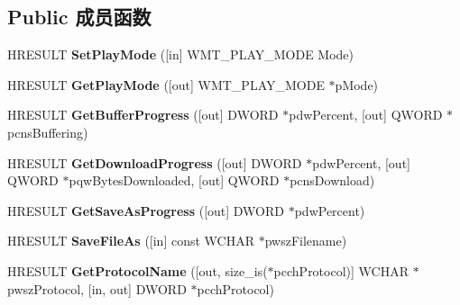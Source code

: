 \subsection*{Public 成员函数}
\begin{DoxyCompactItemize}
\item 
\mbox{\label{interface_i_w_m_reader_advanced2_a813b6b5068ddf5d5da92f3948059e417}} 
H\+R\+E\+S\+U\+LT {\bfseries Set\+Play\+Mode} (\mbox{[}in\mbox{]} W\+M\+T\+\_\+\+P\+L\+A\+Y\+\_\+\+M\+O\+DE Mode)
\item 
\mbox{\label{interface_i_w_m_reader_advanced2_abf1b3b4c48dd11c4fdda7e8d1f95f107}} 
H\+R\+E\+S\+U\+LT {\bfseries Get\+Play\+Mode} (\mbox{[}out\mbox{]} W\+M\+T\+\_\+\+P\+L\+A\+Y\+\_\+\+M\+O\+DE $\ast$p\+Mode)
\item 
\mbox{\label{interface_i_w_m_reader_advanced2_af080814eeff56e33e0cd3c07575a887b}} 
H\+R\+E\+S\+U\+LT {\bfseries Get\+Buffer\+Progress} (\mbox{[}out\mbox{]} D\+W\+O\+RD $\ast$pdw\+Percent, \mbox{[}out\mbox{]} Q\+W\+O\+RD $\ast$pcns\+Buffering)
\item 
\mbox{\label{interface_i_w_m_reader_advanced2_ab57440dd29f891ff7320f12efdf1b066}} 
H\+R\+E\+S\+U\+LT {\bfseries Get\+Download\+Progress} (\mbox{[}out\mbox{]} D\+W\+O\+RD $\ast$pdw\+Percent, \mbox{[}out\mbox{]} Q\+W\+O\+RD $\ast$pqw\+Bytes\+Downloaded, \mbox{[}out\mbox{]} Q\+W\+O\+RD $\ast$pcns\+Download)
\item 
\mbox{\label{interface_i_w_m_reader_advanced2_a3c2fcf9781498aa648ec874a13702f8d}} 
H\+R\+E\+S\+U\+LT {\bfseries Get\+Save\+As\+Progress} (\mbox{[}out\mbox{]} D\+W\+O\+RD $\ast$pdw\+Percent)
\item 
\mbox{\label{interface_i_w_m_reader_advanced2_a2cdacaf9b7a902bb61eeae4c25bf534d}} 
H\+R\+E\+S\+U\+LT {\bfseries Save\+File\+As} (\mbox{[}in\mbox{]} const W\+C\+H\+AR $\ast$pwsz\+Filename)
\item 
\mbox{\label{interface_i_w_m_reader_advanced2_aeb9d40b3bf83640a8529985241d39f6b}} 
H\+R\+E\+S\+U\+LT {\bfseries Get\+Protocol\+Name} (\mbox{[}out, size\+\_\+is($\ast$pcch\+Protocol)\mbox{]} W\+C\+H\+AR $\ast$pwsz\+Protocol, \mbox{[}in, out\mbox{]} D\+W\+O\+RD $\ast$pcch\+Protocol)

\end{DoxyCompactItemize}
